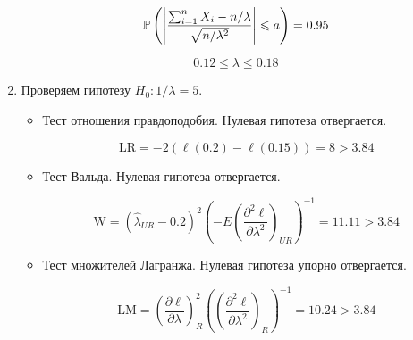 \begin{problem}
\begin{sol}
\begin{enumerate}
\[\P\left( \left|\frac{\sum_{i=1}^{n}X_i-n/\lambda}{\sqrt{n/\lambda^2}}\right|\leqslant a\right)=0.95\]

\[0.12 \leqslant \lambda \leqslant 0.18\]

\item Проверяем гипотезу $H_0: 1/\lambda = 5$.

\begin{itemize}
  \item Тест отношения правдоподобия. Нулевая гипотеза отвергается.

    \[\text{LR} = -2(\ell(0.2)-\ell(0.15)) = 8 > 3.84\]

    \item Тест Вальда. Нулевая гипотеза отвергается.

    \[\text{W} = \left(\hat{\lambda}_{UR} - 0.2\right) ^2\left( -E\left(\frac{\partial^2 \ell}{\partial \lambda^2}\right)_{UR}\right)^{-1} = 11.11 > 3.84 \]

        \item Тест множителей Лагранжа. Нулевая гипотеза упорно отвергается.

    \[\text{LM} = \left( \frac{\partial \ell}{\partial\lambda}\right)_R^2 \left( \left(\frac{\partial^2 \ell}{\partial \lambda^2}\right)_{R}\right)^{-1} = 10.24 > 3.84 \]
\end{itemize}
\end{enumerate}
\end{sol}
\end{problem}




